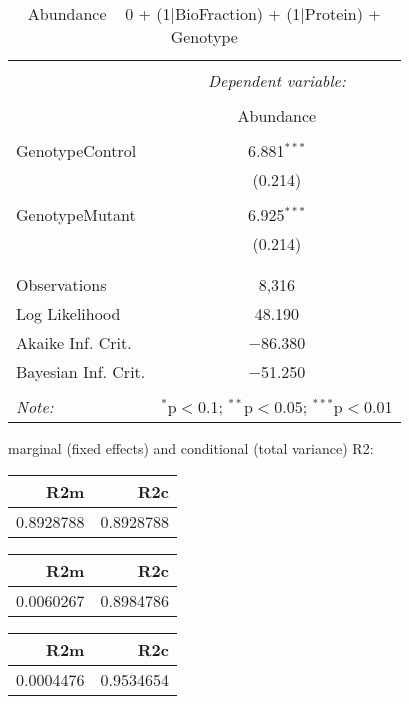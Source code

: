 \documentclass[11pt]{report}
\begin{document}
\begin{table}[!htbp] \centering 
  \caption{Abundance ~ 0 + (1|BioFraction) + (1|Protein) + Genotype} 
  \label{} 
\begin{tabular}{@{\extracolsep{5pt}}lc} 
\\[-1.8ex]\hline 
\hline \\[-1.8ex] 
 & \multicolumn{1}{c}{\textit{Dependent variable:}} \\ 
\cline{2-2} 
\\[-1.8ex] & Abundance \\ 
\hline \\[-1.8ex] 
 GenotypeControl & 6.881$^{***}$ \\ 
  & (0.214) \\ 
  & \\ 
 GenotypeMutant & 6.925$^{***}$ \\ 
  & (0.214) \\ 
  & \\ 
\hline \\[-1.8ex] 
Observations & 8,316 \\ 
Log Likelihood & 48.190 \\ 
Akaike Inf. Crit. & $-$86.380 \\ 
Bayesian Inf. Crit. & $-$51.250 \\ 
\hline 
\hline \\[-1.8ex] 
\textit{Note:}  & \multicolumn{1}{r}{$^{*}$p$<$0.1; $^{**}$p$<$0.05; $^{***}$p$<$0.01} \\ 
\end{tabular} 
\end{table} 
marginal (fixed effects) and conditional (total variance) R2:

\begin{tabular}{r|r}
\hline
R2m & R2c\\
\hline
0.8928788 & 0.8928788\\
\hline
\end{tabular}

\begin{tabular}{r|r}
\hline
R2m & R2c\\
\hline
0.0060267 & 0.8984786\\
\hline
\end{tabular}

\begin{tabular}{r|r}
\hline
R2m & R2c\\
\hline
0.0004476 & 0.9534654\\
\hline
\end{tabular}
\end{document}
